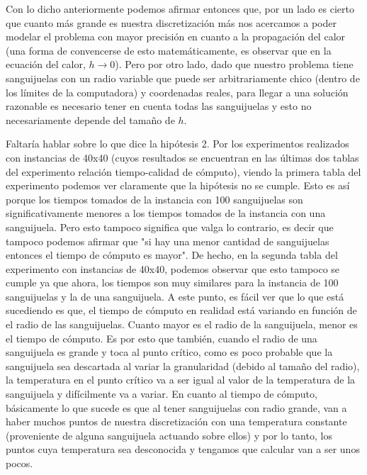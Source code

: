 \par Con lo dicho anteriormente podemos afirmar entonces que, por un lado es cierto que cuanto más grande es nuestra discretización más nos acercamos a poder modelar el problema con mayor precisión en cuanto a la propagación del calor (una forma de convencerse de esto matemáticamente, es observar que en la ecuación del calor, $h\to 0$). Pero por otro lado, dado que nuestro problema tiene sanguijuelas con un radio variable que puede ser arbitrariamente chico (dentro de los límites de la computadora) y coordenadas reales, para llegar a una solución razonable es necesario tener en cuenta todas las sanguijuelas y esto no necesariamente depende del tamaño de $h$.
\par Faltaría hablar sobre lo que dice la hipótesis 2. Por los experimentos realizados con instancias de 40x40 (cuyos resultados se encuentran en las últimas dos tablas del experimento relación tiempo-calidad de cómputo), viendo la primera tabla del experimento podemos ver claramente que la hipótesis no se cumple. Esto es así porque los tiempos tomados de la instancia con 100 sanguijuelas son significativamente menores a los tiempos tomados de la instancia con una sanguijuela. Pero esto tampoco significa que valga lo contrario, es decir que tampoco podemos afirmar que "si hay una menor cantidad de sanguijuelas entonces el tiempo de cómputo es mayor". De hecho, en la segunda tabla del experimento con instancias de 40x40, podemos observar que esto tampoco se cumple ya que ahora, los tiempos son muy similares para la instancia de 100 sanguijuelas y la de una sanguijuela. A este punto, es fácil ver que lo que está sucediendo es que, el tiempo de cómputo en realidad está variando en función de el radio de las sanguijuelas. Cuanto mayor es el radio de la sanguijuela, menor es el tiempo de cómputo. Es por esto que también, cuando el radio de una sanguijuela es grande y toca al punto crítico, como es poco probable que la sanguijuela sea descartada al variar la granularidad (debido al tamaño del radio), la temperatura en el punto crítico va a ser igual al valor de la temperatura de la sanguijuela y difícilmente va a variar. En cuanto al tiempo de cómputo, básicamente lo que sucede es que al tener sanguijuelas con radio grande, van a haber muchos puntos de nuestra discretización con una temperatura constante (proveniente de alguna sanguijuela actuando sobre ellos) y por lo tanto, los puntos cuya temperatura sea desconocida y tengamos que calcular van a ser unos pocos.